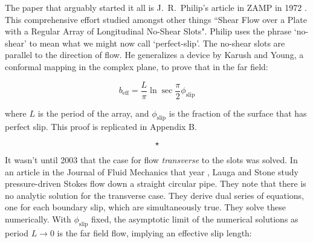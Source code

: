 \documentclass[a4paper]{report}
\newcommand{\beff}{\ensuremath{b_{\mathrm{eff}}}}
\newcommand{\phislip}{\ensuremath{\phi_{\mathrm{slip}}}}
\newcommand{\sep}{\begin{equation*} \star \end{equation*}}
\begin{document}
The paper that arguably started it all is J.\ R.\ Philip's article in ZAMP in 1972 \cite{Philip1972}.  This comprehensive effort studied amongst other things ``Shear Flow over a Plate with a Regular Array of Longitudinal No-Shear Slots".  Philip uses the phrase `no-shear' to mean what we might now call `perfect-slip'.  The no-shear slots are parallel to the direction of flow.   He generalizes a device by Karush and Young, a conformal mapping in the complex plane, to prove that in the far field:

\[ \beff= \frac{L}{\pi}	\ln \sec \frac{\pi}{2} \phislip \]

where $L$ is the period of the array, and $\phislip$ is the fraction of the surface that has perfect slip. This proof is replicated in Appendix B.

\begin{center}
\end{center}


\sep

It wasn't until 2003 that the case for flow \emph{transverse} to the slots was solved.  
In an article in the Journal of Fluid Mechanics that year \cite{LaugaStone2003}, Lauga and Stone study pressure-driven Stokes flow down a straight circular pipe.  They note that there is no analytic solution for the transverse case.  They derive dual series of equations, one for each boundary slip, which are simultaneously true.  They solve these numerically.  With $\phislip$ fixed, the asymptotic limit of the numerical solutions as period $L \rightarrow 0$ is the far field flow, implying an effective slip length:
\end{document}
